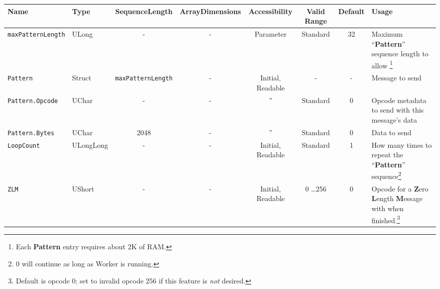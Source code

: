 \documentclass{article}
\begin{document}
\begin{landscape}
\begin{scriptsize}
\begin{minipage}{\textwidth}
			\begin{tabular}{|p{3cm}|p{1.5cm}|c|c|c|c|c|p{7cm}|}
				\hline
				\rowcolor{blue}
				Name                          & Type      & SequenceLength          & ArrayDimensions & Accessibility     & Valid Range  & Default & Usage                                                                                                                                                                             \\
				\hline
				\verb+maxPatternLength+       & ULong     & -                       & -               & Parameter         & Standard     & 32      & Maximum ``\textbf{Pattern}'' sequence length to allow \footnote{Each \textbf{Pattern} entry requires about 2K of RAM.}                                                            \\
				\hline
				\verb+Pattern+                & Struct    & \verb+maxPatternLength+ & -               & Initial, Readable & -            & -       & Message to send                                                                                                                                                                   \\
				\hline
				\verb+Pattern.Opcode+         & UChar     & -                       & -               & ''                 & Standard     & 0       & Opcode metadata to send with this message's data                                                                                                                                  \\
				\hline
				\verb+Pattern.Bytes+          & UChar     & 2048                    & -               & ''                 & Standard     & 0       & Data to send                                                                                                                                                                      \\
				\hline
				\verb+LoopCount+              & ULongLong & -                       & -               & Initial, Readable & Standard     & 1       & How many times to repeat the ``\textbf{Pattern}'' sequence\footnote{0 will continue as long as Worker is running.}                                                                \\
				\hline
				\verb+ZLM+                    & UShort    & -                       & -               & Initial, Readable & 0 \ldots 256 & 0       & Opcode for a \textbf{Z}ero \textbf{L}ength \textbf{M}essage with when finished.\footnote{Default is opcode 0; set to invalid opcode 256 if this feature is \textit{not} desired.} \\

\end{tabular}
\end{minipage}
\end{scriptsize}
\end{landscape}
\end{document}
